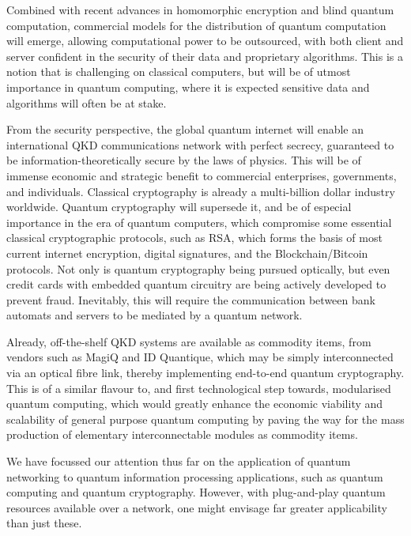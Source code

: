 \documentclass[aps, rmp, twocolumn, amsmath, amssymb, nofootinbib, superscriptaddress, longbibliography, floatfix, table-of-contents, eqsecnum]{revtex4-1}
\begin{document}
Combined with recent advances in homomorphic encryption and blind quantum computation, commercial models for the distribution of quantum computation will emerge, allowing computational power to be outsourced, with both client and server confident in the security of their data and proprietary algorithms. This is a notion that is challenging on classical computers, but will be of utmost importance in quantum computing, where it is expected sensitive data and algorithms will often be at stake.

From the security perspective, the global quantum internet will enable an international QKD communications network with perfect secrecy, guaranteed to be information-theoretically secure by the laws of physics. This will be of immense economic and strategic benefit to commercial enterprises, governments, and individuals. Classical cryptography is already a multi-billion dollar industry worldwide. Quantum cryptography will supersede it, and be of especial importance in the era of quantum computers, which compromise some essential classical cryptographic protocols, such as RSA, which forms the basis of most current internet encryption, digital signatures, and the Blockchain/Bitcoin protocols. Not only is quantum cryptography being pursued optically, but even credit cards with embedded quantum circuitry are being actively developed to prevent fraud. Inevitably, this will require the communication between bank automats and servers to be mediated by a quantum network.

Already, off-the-shelf QKD systems are available as commodity items, from vendors such as MagiQ and ID Quantique, which may be simply interconnected via an optical fibre link, thereby implementing end-to-end quantum cryptography. This is of a similar flavour to, and first technological step towards, modularised quantum computing, which would greatly enhance the economic viability and scalability of general purpose quantum computing by paving the way for the mass production of elementary interconnectable modules as commodity items.

We have focussed our attention thus far on the application of quantum networking to quantum information processing applications, such as quantum computing and quantum cryptography. However, with plug-and-play quantum resources available over a network, one might envisage far greater applicability than just these.
\end{document}
